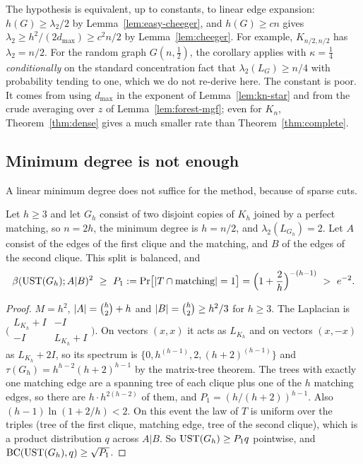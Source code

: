 The hypothesis is equivalent, up to constants, to linear edge expansion: $h(G)\ge\lambda_2/2$ by Lemma~\ref{lem:easy-cheeger}, and $h(G)\ge cn$ gives $\lambda_2\ge h^2/(2d_{\max})\ge c^2n/2$ by Lemma~\ref{lem:cheeger}. For example, $K_{n/2,n/2}$ has $\lambda_2=n/2$. For the random graph $G(n,\frac12)$, the corollary applies with $\kappa=\frac14$ \emph{conditionally} on the standard concentration fact that $\lambda_2(L_G)\ge n/4$ with probability tending to one, which we do not re-derive here. The constant is poor. It comes from using $d_{\max}$ in the exponent of Lemma~\ref{lem:kn-star} and from the crude averaging over $z$ of Lemma~\ref{lem:forest-mgf}; even for $K_n$, Theorem~\ref{thm:dense} gives a much smaller rate than Theorem~\ref{thm:complete}.

\subsection{Minimum degree is not enough}

A linear minimum degree does not suffice for the method, because of sparse cuts.

\begin{proposition}\label{prop:two-cliques}
Let $h\ge3$ and let $G_h$ consist of two disjoint copies of $K_h$ joined by a perfect matching, so $n=2h$, the minimum degree is $h=n/2$, and $\lambda_2(L_{G_h})=2$. Let $A$ consist of the edges of the first clique and the matching, and $B$ of the edges of the second clique. This split is balanced, and
\[
  \beta(\UST(G_h);A|B)^2\ \ge\ P_1:=\Pr\bigl[\abs{T\cap\text{matching}}=1\bigr]=\Bigl(1+\frac2h\Bigr)^{-(h-1)}\ >\ e^{-2} .
\]
\end{proposition}

\begin{proof}
$M=h^2$, $\lvert A\rvert=\binom h2+h$ and $\lvert B\rvert=\binom h2\ge h^2/3$ for $h\ge3$. The Laplacian is $\bigl(\begin{smallmatrix}L_{K_h}+I&-I\\-I&L_{K_h}+I\end{smallmatrix}\bigr)$. On vectors $(x,x)$ it acts as $L_{K_h}$ and on vectors $(x,-x)$ as $L_{K_h}+2I$, so its spectrum is $\{0,h^{(h-1)},2,(h+2)^{(h-1)}\}$ and $\tau(G_h)=h^{h-2}(h+2)^{h-1}$ by the matrix-tree theorem. The trees with exactly one matching edge are a spanning tree of each clique plus one of the $h$ matching edges, so there are $h\cdot h^{2(h-2)}$ of them, and $P_1=(h/(h+2))^{h-1}$. Also $(h-1)\ln(1+2/h)<2$. On this event the law of $T$ is uniform over the triples (tree of the first clique, matching edge, tree of the second clique), which is a product distribution $q$ across $A|B$. So $\mathrm{UST}(G_h)\ge P_1q$ pointwise, and $\mathrm{BC}(\mathrm{UST}(G_h),q)\ge\sqrt{P_1}$.
\end{proof}

